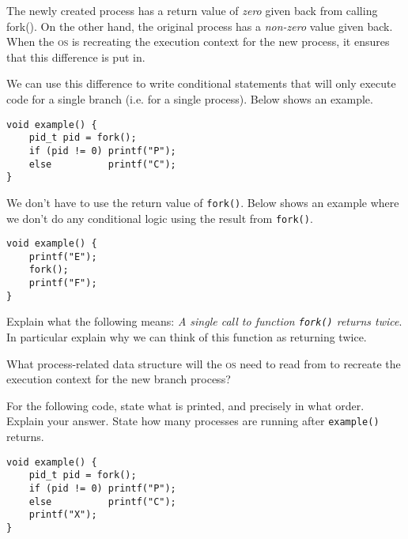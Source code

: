The newly created process has a return value of \textit{zero} given back 
from calling fork(). On the other hand, the original process has a \textit{non-zero} 
value given back. When the \textsc{os} is recreating the execution context
for the new process, it ensures that this difference is put in.

We can use this difference to write conditional statements 
that will only execute code for a single branch (i.e. for a single process). 
Below shows an example.

\frmrule





\begin{example}
\begin{lstlisting}
void example() {
    pid_t pid = fork();
    if (pid != 0) printf("P");
    else          printf("C");
}
\end{lstlisting}
\end{example}

\frmrule

We don't have to use the return value of \lstinline{fork()}. 
Below shows an example where we don't do any 
conditional logic using the result from \lstinline{fork()}.

\begin{example}
\begin{lstlisting}
void example() {
    printf("E");
    fork();
    printf("F");
}
\end{lstlisting}
\end{example}


\frmrule


\begin{example}
Explain what the following 
means: \textit{A single call to function \lstinline{fork()} returns twice}.
In particular explain why we can think of this function as returning 
twice. 
\end{example}

\frmrule

\begin{example}
What process-related data structure will the \textsc{os} need to read from 
to recreate the execution context for the new branch process?
\end{example}

\frmrule


\begin{example}
For the following code, state what is printed, and precisely in what order.
Explain your answer. State how many processes are running 
after \lstinline{example()} returns.
\begin{lstlisting}
void example() {
    pid_t pid = fork();
    if (pid != 0) printf("P");
    else          printf("C");
    printf("X");
}
\end{lstlisting}
\end{example}

